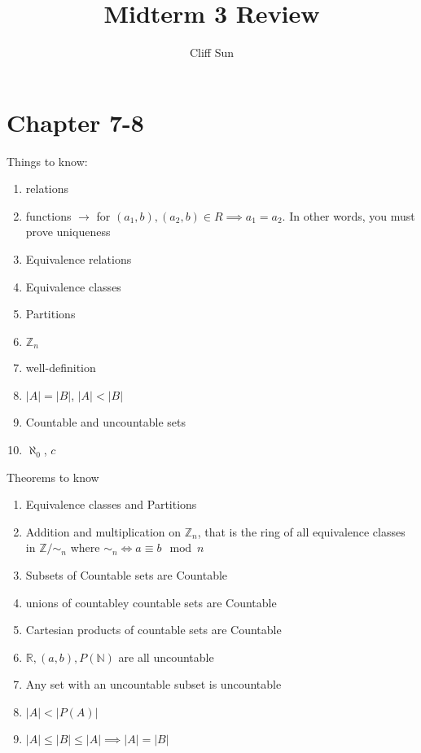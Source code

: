 \documentclass{article}
\title{Midterm 3 Review}
\author{Cliff Sun}
\begin{document}
\maketitle

\section*{Chapter 7-8}

Things to know:
\begin{enumerate}
    \item relations
    \item functions $\rightarrow$ for $(a_1,b), (a_2,b) \in R \implies a_1 = a_2$. In other words, you must prove uniqueness
    \item Equivalence relations
    \item Equivalence classes
    \item Partitions
    \item $\mathbb{Z}_n$
    \item well-definition
    \item $|A| = |B|$, $|A| < |B|$
    \item Countable and uncountable sets
    \item $\aleph_0$, $c$
\end{enumerate}

Theorems to know
\begin{enumerate}
    \item Equivalence classes and Partitions
    \item Addition and multiplication on $\mathbb{Z}_n$, that is the ring of all equivalence classes in $\mathbb{Z}/\sim_n$ where $\sim_n \iff a \equiv b \mod n$
    \item Subsets of Countable sets are Countable
    \item unions of countabley countable sets are Countable
    \item Cartesian products of countable sets are Countable
    \item $\mathbb{R}, (a,b), P(\mathbb{N})$ are all uncountable
    \item Any set with an uncountable subset is uncountable
    \item $|A| < |P(A)|$
    \item $|A| \leq |B| \leq |A| \implies |A| = |B|$
\end{enumerate}
\end{document}
